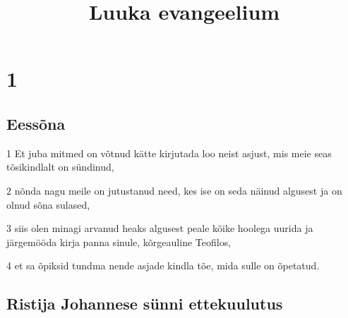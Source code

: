 

\title{Luuka evangeelium}

\chapter{1}

\section*{Eessõna}

\par 1 Et juba mitmed on võtnud kätte kirjutada loo neist asjust, mis meie seas tõsikindlalt on sündinud,
\par 2 nõnda nagu meile on jutustanud need, kes ise on seda näinud algusest ja on olnud sõna sulased,
\par 3 siis olen minagi arvanud heaks algusest peale kõike hoolega uurida ja järgemööda kirja panna sinule, kõrgeauline Teofilos,
\par 4 et sa õpiksid tundma nende asjade kindla tõe, mida sulle on õpetatud.

\section*{Ristija Johannese sünni ettekuulutus}

